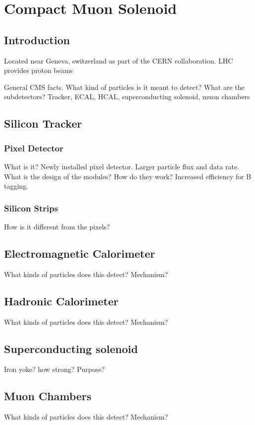 \chapter{Compact Muon Solenoid}
\label{ch:CMS}

\section{Introduction}
\label{sec:cmsIntro}

Located near Geneva, switzerland as part of the CERN collaboration. LHC provides proton beams

General CMS facts. What kind of particles is it meant to detect? What are the subdetectors? Tracker, ECAL, HCAL, superconducting solenoid, muon chambers

\section{Silicon Tracker}
\label{sec:Tracker}

\subsection{Pixel Detector}
\label{subsec:Pixel}

What is it?
Newly installed pixel detector. Larger particle flux and data rate. What is the design of the modules? How do they work?
Increased efficiency for B tagging.

\subsection{Silicon Strips}
\label{subsec:Strips}

How is it different from the pixels?

\section{Electromagnetic Calorimeter}
\label{sec:ECAL}

What kinds of particles does this detect? Mechanism?

\section{Hadronic Calorimeter}
\label{sec:HCAL}

What kinds of particles does this detect? Mechanism?

\section{Superconducting solenoid}
\label{sec:Solenoid}

Iron yoke? how strong? Purpose?

\section{Muon Chambers}
\label{sec:muCham}

What kinds of particles does this detect? Mechanism?